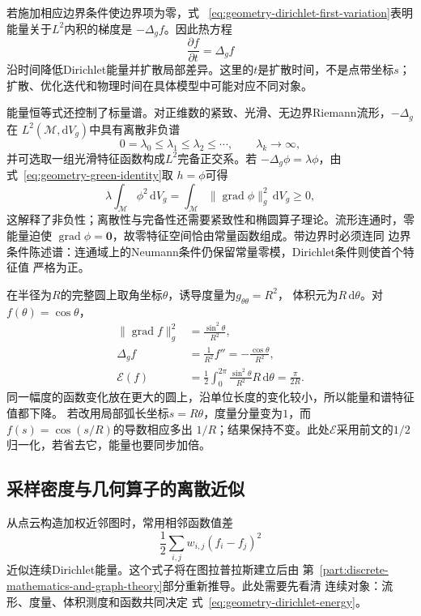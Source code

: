 若施加相应边界条件使边界项为零，式
~\eqref{eq:geometry-dirichlet-first-variation}表明能量关于$L^2$内积的梯度是
$-\Delta_gf$。因此热方程
\begin{equation}
  \frac{\partial f}{\partial t}
  =
  \Delta_gf
  \label{eq:geometry-heat-equation}
\end{equation}
沿时间降低Dirichlet能量并扩散局部差异。这里的$t$是扩散时间，不是点带坐标$s$；
扩散、优化迭代和物理时间在具体模型中可能对应不同对象。

能量恒等式还控制了标量谱。对正维数的紧致、光滑、无边界Riemann流形，$-\Delta_g$在
$L^2(\mathcal{M},\mathrm{d}V_g)$中具有离散非负谱
\[
  0=\lambda_0\leq\lambda_1\leq\lambda_2\leq\cdots,
  \qquad
  \lambda_k\to\infty,
\]
并可选取一组光滑特征函数构成$L^2$完备正交系。若
$-\Delta_g\phi=\lambda\phi$，由式~\eqref{eq:geometry-green-identity}取
$h=\phi$可得
\[
  \lambda\int_{\mathcal{M}}\phi^2\,\mathrm{d}V_g
  =
  \int_{\mathcal{M}}
  \lVert\operatorname{grad}\phi\rVert_g^2
  \,\mathrm{d}V_g
  \geq0,
\]
这解释了非负性；离散性与完备性还需要紧致性和椭圆算子理论。流形连通时，零能量迫使
$\operatorname{grad}\phi=\bm{0}$，故零特征空间恰由常量函数组成。带边界时必须连同
边界条件陈述谱：连通域上的Neumann条件仍保留常量零模，Dirichlet条件则使首个特征值
严格为正。

\begin{example}
\label{ex:geometry-circle-energy-scale}
在半径为$R$的完整圆上取角坐标$\theta$，诱导度量为$g_{\theta\theta}=R^2$，
体积元为$R\,\mathrm d\theta$。对$f(\theta)=\cos\theta$，
\[
 \begin{aligned}
 \lVert\operatorname{grad}f\rVert_g^2
   &=\frac{\sin^2\theta}{R^2},\\
 \Delta_g f&=\frac{1}{R^2}f''=-\frac{\cos\theta}{R^2},\\
 \mathcal E(f)&=\frac12\int_0^{2\pi}\frac{\sin^2\theta}{R^2}R\,\mathrm d\theta
              =\frac{\pi}{2R}.
 \end{aligned}
\]
同一幅度的函数变化放在更大的圆上，沿单位长度的变化较小，所以能量和谱特征值都下降。
若改用局部弧长坐标$s=R\theta$，度量分量变为$1$，而$f(s)=\cos(s/R)$的导数相应多出
$1/R$；结果保持不变。此处$\mathcal E$采用前文的$1/2$归一化，若省去它，能量也要同步加倍。
\end{example}

\subsection{采样密度与几何算子的离散近似}

从点云构造加权近邻图时，常用相邻函数值差
\[
  \frac12\sum_{i,j}w_{i,j}(f_i-f_j)^2
\]
近似连续Dirichlet能量。这个式子将在图拉普拉斯建立后由
第~\ref{part:discrete-mathematics-and-graph-theory}部分重新推导。此处需要先看清
连续对象：流形、度量、体积测度和函数共同决定
式~\eqref{eq:geometry-dirichlet-energy}。

